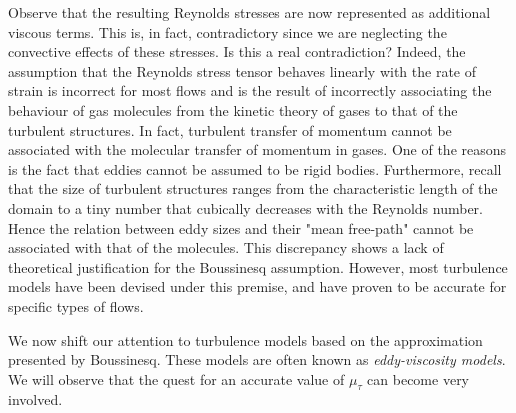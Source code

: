 Observe that the resulting Reynolds stresses are now represented as additional viscous terms. This is, in fact, contradictory since we are neglecting the convective effects of these stresses. Is this a real contradiction?  Indeed, the assumption that the Reynolds stress tensor behaves linearly with the rate of strain is incorrect for most flows and is the result of incorrectly associating the behaviour of gas molecules from the kinetic theory of gases to that of the turbulent structures. In fact, turbulent transfer of momentum cannot be associated with the molecular transfer of momentum in gases. One of the reasons is the fact that eddies cannot be assumed to be rigid bodies. Furthermore, recall that the size of turbulent structures ranges from the characteristic length of the domain to a tiny number that cubically decreases with the Reynolds number. Hence the relation between eddy sizes and their "mean free-path" cannot be associated with that of the molecules. This discrepancy shows a lack of theoretical justification for the Boussinesq assumption. However, most turbulence models have been devised under this premise, and have proven to be accurate for specific types of flows.

We now shift our attention to turbulence models based on the approximation presented by Boussinesq. These models are often known as \textit{eddy-viscosity models}. We will observe that the quest for an accurate value of $\mu_\tau$ can become very involved. 

